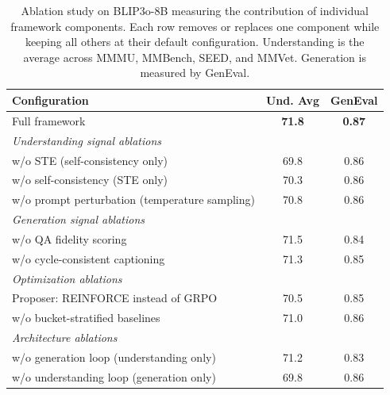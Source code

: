 \begin{table}[!htb]
  \caption{Ablation study on BLIP3o-8B measuring the contribution of individual framework components. Each row removes or replaces one component while keeping all others at their default configuration. Understanding is the average across MMMU, MMBench, SEED, and MMVet. Generation is measured by GenEval.}
  \label{tab:ablation_alt}
  \centering
  \small
  \begin{tabular}{lcc}
    \toprule
    Configuration & Und. Avg & GenEval \\
    \midrule
    Full framework & \textbf{71.8} & \textbf{0.87} \\
    \midrule
    \multicolumn{3}{l}{\emph{Understanding signal ablations}} \\
    \quad w/o STE (self-consistency only) & 69.8 & 0.86 \\
    \quad w/o self-consistency (STE only) & 70.3 & 0.86 \\
    \quad w/o prompt perturbation (temperature sampling) & 70.8 & 0.86 \\
    \midrule
    \multicolumn{3}{l}{\emph{Generation signal ablations}} \\
    \quad w/o QA fidelity scoring & 71.5 & 0.84 \\
    \quad w/o cycle-consistent captioning & 71.3 & 0.85 \\
    \midrule
    \multicolumn{3}{l}{\emph{Optimization ablations}} \\
    \quad Proposer: REINFORCE instead of GRPO & 70.5 & 0.85 \\
    \quad w/o bucket-stratified baselines & 71.0 & 0.86 \\
    \midrule
    \multicolumn{3}{l}{\emph{Architecture ablations}} \\
    \quad w/o generation loop (understanding only) & 71.2 & 0.83 \\
    \quad w/o understanding loop (generation only) & 69.8 & 0.86 \\
    \bottomrule
  \end{tabular}
\end{table}
